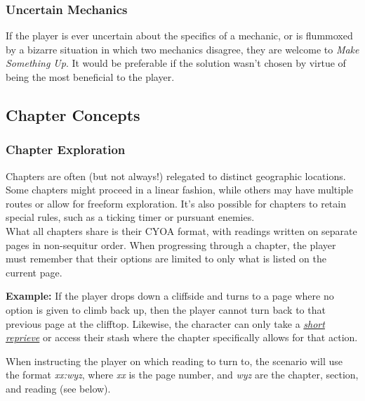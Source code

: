 \documentclass[12pt]{article}
\newcommand{\reftoit}[1]{\hyperlink{#1}{\emph{#1}}}
\begin{document}
\begin{multicols*}{2}
\subsubsection*{Uncertain Mechanics}
If the player is ever uncertain about the specifics of a mechanic, or is flummoxed by a bizarre situation in which two mechanics disagree, they are welcome to \emph{Make Something Up}. It would be preferable if the solution wasn’t chosen by virtue of being the most beneficial to the player.

\vfill
\pagebreak

\subsection{Chapter Concepts}
\subsubsection{Chapter Exploration}
Chapters are often (but not always!) relegated to distinct geographic locations. Some chapters might proceed in a linear fashion, while others may have multiple routes or allow for freeform exploration. It’s also possible for chapters to retain special rules, such as a ticking timer or pursuant enemies. \\
What all chapters share is their CYOA format, with readings written on separate pages in non-sequitur order. When progressing through a chapter, the player must remember that their options are limited to only what is listed on the current page.

\begin{tcolorbox}
\textbf{Example:} If the player drops down a cliffside and turns to a page where no option is given to climb back up, then the player cannot turn back to that previous page at the clifftop. Likewise, the character can only take a \reftoit{short reprieve} or access their stash where the chapter specifically allows for that action.
\end{tcolorbox}

When instructing the player on which reading to turn to, the scenario will use the format \emph{xx:wyz}, where \emph{xx} is the page number, and \emph{wyz} are the chapter, section, and reading (see below).


\end{multicols*}
\end{document}
